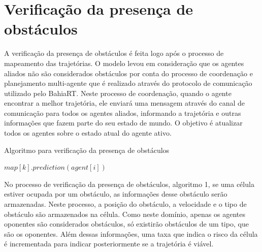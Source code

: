 \section{Verificação da presença de obstáculos}
\label{sec:verifobstaculos}
A verificação da presença de obstáculos é feita logo após o processo de mapeamento das trajetórias. O modelo levou em consideração 
que os agentes aliados não são considerados obstáculos por conta do processo de coordenação e planejamento multi-agente que é 
realizado através do protocolo de comunicação utilizado pelo BahiaRT. Neste processo de coordenação, quando o agente encontrar a 
melhor trajetória, ele enviará uma mensagem através do canal de comunicação para todos os agentes aliados, informando a trajetória e 
outras informações que fazem parte do seu estado de mundo. O objetivo é atualizar todos os agentes sobre o estado atual do 
agente ativo.

\begin{algorithm}[!htb]
\caption{Algoritmo para verificação da presença de obstáculos}

\begin{algorithmic}[3.1]
  
  \State $map[k].prediction(agent[i])$ 
  
    
     
      
      
      
      
      
     
     \EndIf
    \EndIf
  \EndIf
  \EndFor
\EndFor
\end{algorithmic}
\end{algorithm}

No processo de verificação da presença de obstáculos, algoritmo 1, se uma célula estiver ocupada por um 
obstáculo, as informações desse obstáculo serão armazenadas. Neste processo, a posição do obstáculo, a velocidade e o tipo 
de obstáculo são armazenados na célula. Como neste domínio, apenas os agentes oponentes são considerados obstáculos, só 
existirão obstáculos de um tipo, que são os oponentes. Além dessas informações, uma taxa que indica o risco da célula é 
incrementada para indicar posteriormente se a trajetória é viável.

